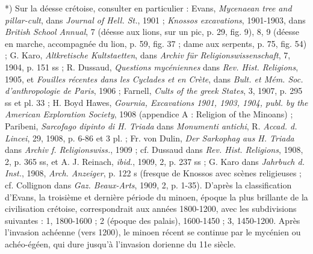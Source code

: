 \documentclass[a4paper, 11pt, oneside, polutonikogreek, french]{article}
\begin{document}
*) Sur la déesse crétoise, consulter en particulier : Evans, \emph{Mycenaean tree and pillar-cult}, dans \emph{Journal of Hell. St.}, 1901 ; \emph{Knossos excavations}, 1901-1903, dans \emph{British School Annual}, 7 (déesse aux lions, sur un pic, p. 29, fig. 9), 8, 9 (déesse en marche, accompagnée du lion, p. 59, fig. 37 ; dame aux serpents, p. 75, fig. 54) ; G. Karo, \emph{Altkretische Kultstaetten}, dans \emph{Archiv für Religionswissenschaft}, 7, 1904, p. 151 ss ; R. Dussaud, \emph{Questions mycéniennes} dans \emph{Rev. Hist. Religions}, 1905, et \emph{Fouilles récentes dans les Cyclades et en Crète}, dans \emph{Bult. et Mém. Soc. d'anthropologie de Paris}, 1906 ; Farnell, \emph{Cults of the greek States}, 3, 1907, p. 295 ss et pl. 33 ; H. Boyd Hawes, \emph{Gournia, Excavations 1901, 1903, 1904, publ. by the American Exploration Society}, 1908 (appendice A : Religion of the Minoans) ; Paribeni, \emph{Sarcofago dipinto di H. Triada} dans \emph{Monumenti antichi}, R. \emph{Accad. d. Lincei}, 29, 1908, p. 6-86 et 3 pl. ; Fr. von Dulin, \emph{Der Sarkophag aus H. Triada} dans \emph{Archiv f. Religionswiss.}, 1909 ; cf. Dussaud dans \emph{Rev. Hist. Religions}, 1908, 2, p. 365 ss, et A. J. Reinach, \emph{ibid.}, 1909, 2, p. 237 ss ; G. Karo dans \emph{Jahrbuch d. Inst.}, 1908, \emph{Arch. Anzeiger}, p. 122 s (fresque de Knossos avec scènes religieuses ; cf. Collignon dans \emph{Gaz. Beaux-Arts}, 1909, 2, p. 1-35). D'après la classification d'Evans, la troisième et dernière période du minoen, époque la plus brillante de la civilisation crétoise, correspondrait aux années 1800-1200, avec les subdivisions suivantes : 1, 1800-1600 ; 2 (époque des palais), 1600-1450 ; 3, 1450-1200. Après l'invasion achéenne (vers 1200), le minoen récent se continue par le mycénien ou achéo-égéen, qui dure jusqu'à l'invasion dorienne du 11e siècle.
\end{document}
